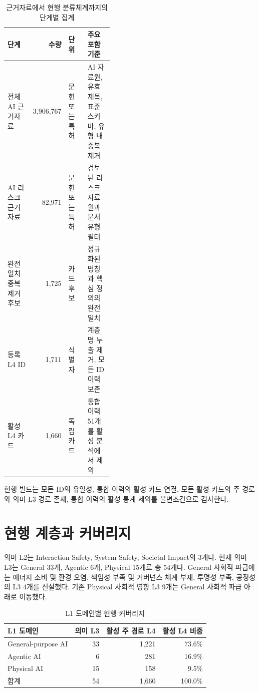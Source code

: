 \documentclass[11pt,a4paper]{article}
\begin{document}
\begin{table}[H]
\centering
\caption{근거자료에서 현행 분류체계까지의 단계별 집계}
\small
\begin{tabularx}{\linewidth}{L{0.24\linewidth}r L{0.18\linewidth}Y}
\toprule
단계 & 수량 & 단위 & 주요 포함 기준 \\
\midrule
전체 AI 근거자료 & 3,906,767 & 문헌 또는 특허 & AI 자료원, 유효 제목, 표준 스키마, 유형 내 중복 제거 \\
AI 리스크 근거자료 & 82,971 & 문헌 또는 특허 & 검토된 리스크 자료원과 문서 유형 필터 \\
완전일치 중복 제거 후보 & 1,725 & 카드 후보 & 정규화된 명칭과 핵심 정의의 완전일치 \\
등록 L4 ID & 1,711 & 식별자 & 계층명 누출 제거, 모든 ID 이력 보존 \\
활성 L4 카드 & 1,660 & 독립 카드 & 통합 이력 51개를 활성 분석에서 제외 \\
\bottomrule
\end{tabularx}
\end{table}

현행 빌드는 모든 ID의 유일성, 통합 이력의 활성 카드 연결, 모든 활성 카드의
주 경로와 의미 L3 경로 존재, 통합 이력의 활성 통계 제외를 불변조건으로
검사한다.

\section{현행 계층과 커버리지}

의미 L2는 Interaction Safety, System Safety, Societal Impact의 3개다.
현재 의미 L3는 General 33개, Agentic 6개, Physical 15개로 총 54개다.
General 사회적 파급에는 에너지 소비 및 환경 오염, 책임성 부족 및 거버넌스
체계 부재, 투명성 부족, 공정성의 L3 4개를 신설했다. 기존 Physical 사회적
영향 L3 9개는 General 사회적 파급 아래로 이동했다.

\begin{table}[H]
\centering
\caption{L1 도메인별 현행 커버리지}
\begin{tabular}{lrrr}
\toprule
L1 도메인 & 의미 L3 & 활성 주 경로 L4 & 활성 L4 비중 \\
\midrule
General-purpose AI & 33 & 1,221 & 73.6\% \\
Agentic AI & 6 & 281 & 16.9\% \\
Physical AI & 15 & 158 & 9.5\% \\
\midrule
합계 & 54 & 1,660 & 100.0\% \\
\bottomrule
\end{tabular}
\end{table}
\end{document}
